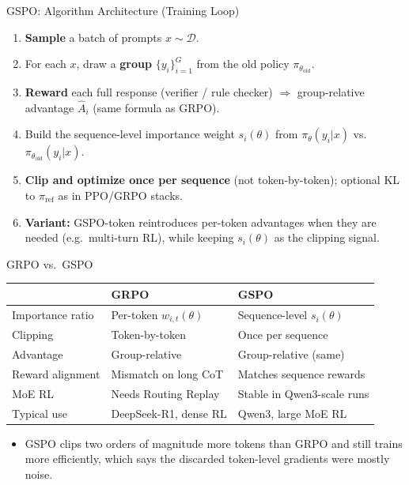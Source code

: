 \begin{frame}{GSPO: Algorithm Architecture (Training Loop)}
  \small
  \begin{enumerate}\itemsep0.35em
    \item \textbf{Sample} a batch of prompts $x \sim \mathcal{D}$.
    \item For each $x$, draw a \textbf{group} $\{y_i\}_{i=1}^G$ from the old policy $\pi_{\theta_{\mathrm{old}}}$.
    \item \textbf{Reward} each full response (verifier / rule checker) $\Rightarrow$ group-relative advantage $\hat{A}_i$ (same formula as GRPO).
    \item Build the sequence-level importance weight $s_i(\theta)$ from $\pi_\theta(y_i|x)$ vs.\ $\pi_{\theta_{\mathrm{old}}}(y_i|x)$.
    \item \textbf{Clip and optimize once per sequence} (not token-by-token); optional KL to $\pi_{\mathrm{ref}}$ as in PPO/GRPO stacks.
    \item \textbf{Variant:} GSPO-token reintroduces per-token advantages when they are needed (e.g.\ multi-turn RL), while keeping $s_i(\theta)$ as the clipping signal.
  \end{enumerate}
\end{frame}

\begin{frame}{GRPO vs.\ GSPO}
  \small
  \begin{tabular}{@{}p{}p{}p{}@{}}
    \toprule
    & \textbf{GRPO} & \textbf{GSPO} \\
    \midrule
    Importance ratio & Per-token $w_{i,t}(\theta)$ & Sequence-level $s_i(\theta)$ \\
    Clipping & Token-by-token & Once per sequence \\
    Advantage & Group-relative & Group-relative (same) \\
    Reward alignment & Mismatch on long CoT & Matches sequence rewards \\
    MoE RL & Needs Routing Replay & Stable in Qwen3-scale runs \\
    Typical use & DeepSeek-R1, dense RL & Qwen3, large MoE RL \\
    \bottomrule
  \end{tabular}
  \vspace{0.45em}
  \begin{itemize}\itemsep0.3em
    \item[\textcolor{red}{$\blacktriangleright$}] GSPO clips two orders of magnitude more tokens than GRPO and still trains more efficiently, which says the discarded token-level gradients were mostly noise.
  \end{itemize}
\end{frame}

